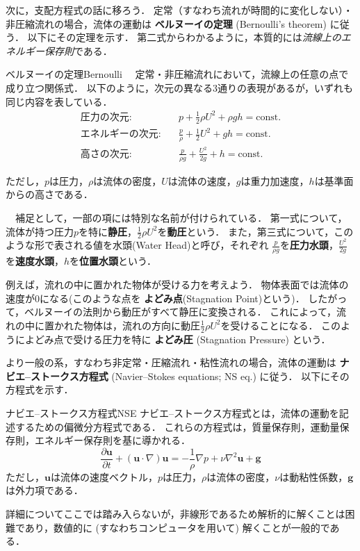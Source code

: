 \documentclass[uplatex,dvipdfmx,a4j,11pt]{jsreport}
\newcommand{\keyword}[1]{\textcolor{mainblue}{\textbf{#1}}}
\numberwithin{equation}{chapter}
\begin{document}
\enskip

次に，支配方程式の話に移ろう．
定常（すなわち流れが時間的に変化しない）・非圧縮流れの場合，流体の運動は \keyword{ベルヌーイの定理} (Bernoulli's theorem) に従う．
以下にその定理を示す．
第二式からわかるように，本質的には\emph{流線上のエネルギー保存則}である．
\begin{definition}{ベルヌーイの定理}{Bernoulli}{}
  　定常・非圧縮流れにおいて，流線上の任意の点で成り立つ関係式．
  以下のように，次元の異なる3通りの表現があるが，いずれも同じ内容を表している．
  \begin{align}
  	\text{圧力の次元}:      &\quad p + \frac{1}{2}\rho U^{2} + \rho g h = \mathrm{const.}\\
  	\text{エネルギーの次元}:&\quad \frac{p}{\rho} + \frac{1}{2} U^{2} + g h = \mathrm{const.}\\
  	\text{高さの次元}:      &\quad \frac{p}{\rho g} + \frac{U^{2}}{2g} + h = \mathrm{const.}
  \end{align}

  ただし，$p$は圧力，$\rho$は流体の密度，$U$は流体の速度，$g$は重力加速度，$h$は基準面からの高さである．

  　補足として，一部の項には特別な名前が付けられている．
  第一式について，流体が持つ圧力$p$を特に\keyword{静圧}，$\frac{1}{2}\rho U^{2}$を\keyword{動圧}という．
  また，第三式について，このような形で表される値を水頭(Water Head)と呼び，それぞれ
  $\frac{p}{\rho g}$を\keyword{圧力水頭}，$\frac{U^{2}}{2g}$を\keyword{速度水頭}，$h$を\keyword{位置水頭}という．
\end{definition}

例えば，流れの中に置かれた物体が受ける力を考えよう．
物体表面では流体の速度が0になる(このような点を \keyword{よどみ点}(Stagnation Point)という)．
したがって，ベルヌーイの法則から動圧がすべて静圧に変換される．
これによって，流れの中に置かれた物体は，流れの方向に動圧$ \frac{1}{2}\rho U^{2} $を受けることになる．
このようによどみ点で受ける圧力を特に \keyword{よどみ圧} (Stagnation Pressure) という．

\enskip

より一般の系，すなわち非定常・圧縮流れ・粘性流れの場合，流体の運動は \keyword{ナビエ--ストークス方程式} (Navier--Stokes equations; NS eq.) に従う．
以下にその方程式を示す．
\begin{definition}{ナビエ--ストークス方程式}{NSE}{}
  ナビエ--ストークス方程式とは，流体の運動を記述するための偏微分方程式である．
  これらの方程式は，質量保存則，運動量保存則，エネルギー保存則を基に導かれる．
    \begin{equation}
    \frac{\partial \mathbf{u}}{\partial t} + (\mathbf{u} \cdot \nabla) \mathbf{u} = -\frac{1}{\rho} \nabla p + \nu \nabla^{2} \mathbf{u} + \mathbf{g}
    \end{equation}
  ただし，$\mathbf{u}$は流体の速度ベクトル，$p$は圧力，$\rho$は流体の密度，$\nu$は動粘性係数，$\mathbf{g}$は外力項である．

\end{definition}
詳細についてここでは踏み入らないが，非線形であるため解析的に解くことは困難であり，数値的に (すなわちコンピュータを用いて) 解くことが一般的である．
\end{document}
